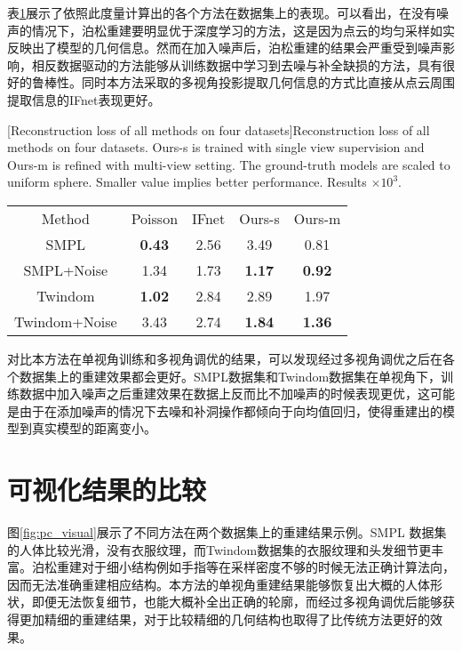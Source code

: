 表\ref{tab:pc_measure}展示了依照此度量计算出的各个方法在数据集上的表现。可以看出，在没有噪声的情况下，泊松重建要明显优于深度学习的方法，这是因为点云的均匀采样如实反映出了模型的几何信息。然而在加入噪声后，泊松重建的结果会严重受到噪声影响，相反数据驱动的方法能够从训练数据中学习到去噪与补全缺损的方法，具有很好的鲁棒性。同时本方法采取的多视角投影提取几何信息的方式比直接从点云周围提取信息的IFnet表现更好。
\begin{table}[!htbp]
[Reconstruction loss of all methods on four datasets]{Reconstruction loss of all methods on four datasets. Ours-s is trained with single view supervision and Ours-m is refined with multi-view setting. The ground-truth models are scaled to uniform sphere. Smaller value implies better performance. Results $\times 10^3$.}
\label{tab:pc_measure}
\centering
\footnotesize%
\setlength{\tabcolsep}{4pt}%
\renewcommand{\arraystretch}{0.9}%
\begin{tabular}{c c c c c}
\hline\noalign{\smallskip}
Method  & Poisson & IFnet & Ours-s & Ours-m \\
\noalign{\smallskip}
\hline
\noalign{\smallskip}
SMPL   & \textbf{0.43} & 2.56 & 3.49 & 0.81 \\
SMPL+Noise & 1.34 & 1.73 & \textbf{1.17} & \textbf{0.92}\\
Twindom & \textbf{1.02} & 2.84 & 2.89 & 1.97 \\
Twindom+Noise & 3.43 & 2.74 &\textbf{1.84} & \textbf{1.36}\\
\hline
\end{tabular}
\end{table}

对比本方法在单视角训练和多视角调优的结果，可以发现经过多视角调优之后在各个数据集上的重建效果都会更好。SMPL数据集和Twindom数据集在单视角下，训练数据中加入噪声之后重建效果在数据上反而比不加噪声的时候表现更优，这可能是由于在添加噪声的情况下去噪和补洞操作都倾向于向均值回归，使得重建出的模型到真实模型的距离变小。

\section{可视化结果的比较}
图\ref{fig:pc_visual}展示了不同方法在两个数据集上的重建结果示例。SMPL
数据集的人体比较光滑，没有衣服纹理，而Twindom数据集的衣服纹理和头发细节更丰富。泊松重建对于细小结构例如手指等在采样密度不够的时候无法正确计算法向，因而无法准确重建相应结构。本方法的单视角重建结果能够恢复出大概的人体形状，即便无法恢复细节，也能大概补全出正确的轮廓，而经过多视角调优后能够获得更加精细的重建结果，对于比较精细的几何结构也取得了比传统方法更好的效果。

